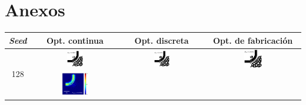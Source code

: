 \begin{table}[H]
    \chapter*{\vspace*{-6cm}Anexos\vspace*{+1.5cm}}\label{chapter:anexos}
    
    \centering
    \vspace*{-2.5cm}
    \hspace*{-3cm}
    \begin{tabular}{|c|c|c|c|}
    \hline 
    \emph{Seed} & Opt. continua & Opt. discreta &  Opt. de fabricación \\
    \hline
      \multirow{2}{*}{128} &
      \includegraphics[width=0.20\textwidth]{image/results/bend/L-BFGS-B/visualize_eps_cont_128.png} &
      \includegraphics[width=0.20\textwidth]{image/results/bend/L-BFGS-B/visualize_eps_disc_128.png} &
      \includegraphics[width=0.20\textwidth]{image/results/bend/L-BFGS-B/visualize_eps_fab_128.png} \\
      \cline{2-4}
      &
      \includegraphics[width=0.33\textwidth]{image/results/bend/L-BFGS-B/visualize_field_cont_128.png} &

\end{tabular}
\end{table}
